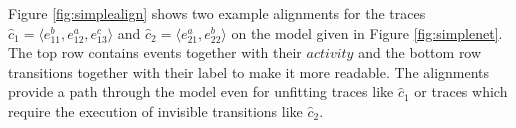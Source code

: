 Figure \ref{fig:simplealign} shows two example alignments for the traces $\hat{c}_1 = \langle e_{11}^b, e_{12}^a, e_{13}^c \rangle$ and $\hat{c}_2 = \langle e_{21}^a, e_{22}^b \rangle$ on the model given in Figure \ref{fig:simplenet}. The top row contains events together with their $activity$ and the bottom row transitions together with their label to make it more readable. The alignments provide a path through the model even for unfitting traces like $\hat{c}_1$ or traces which require the execution of invisible transitions like $\hat{c}_2$.
